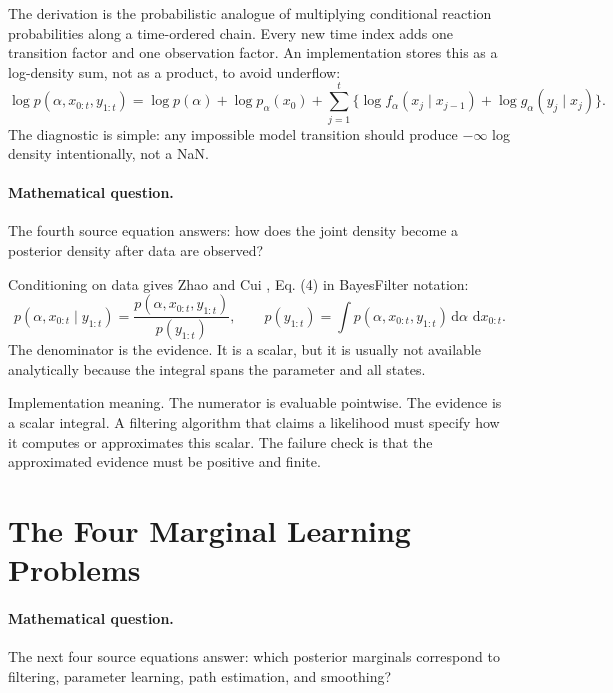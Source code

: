 \documentclass[11pt]{article}
\numberwithin{equation}{section}
\newcommand{\dd}{\,\mathrm d}
\begin{document}
The derivation is the probabilistic analogue of multiplying conditional
reaction probabilities along a time-ordered chain.  Every new time index adds
one transition factor and one observation factor.  An implementation stores
this as a log-density sum, not as a product, to avoid underflow:
\begin{equation}
    \log p(\alpha,x_{0:t},y_{1:t})
    =
    \log p(\alpha)+\log p_\alpha(x_0)
    +
    \sum_{j=1}^t
    \{\log f_\alpha(x_j\mid x_{j-1})+\log g_\alpha(y_j\mid x_j)\}.
    \label{eq:p24-bf-3a}
\end{equation}
The diagnostic is simple: any impossible model transition should produce
\(-\infty\) log density intentionally, not a NaN.

\paragraph{Mathematical question.}
The fourth source equation answers: how does the joint density become a
posterior density after data are observed?

Conditioning on data gives Zhao and Cui \cite{zhao2024ttsequential}, Eq. (4) in BayesFilter notation:
\begin{equation}
    p(\alpha,x_{0:t}\mid y_{1:t})
    =
    \frac{p(\alpha,x_{0:t},y_{1:t})}
    {p(y_{1:t})},
    \qquad
    p(y_{1:t})
    =
    \int p(\alpha,x_{0:t},y_{1:t})
    \dd\alpha\,\dd x_{0:t}.
    \label{eq:p24-bf-4}
\end{equation}
The denominator is the evidence.  It is a scalar, but it is usually not
available analytically because the integral spans the parameter and all states.

Implementation meaning. The numerator is evaluable pointwise.  The
evidence is a scalar integral.  A filtering algorithm that claims a likelihood
must specify how it computes or approximates this scalar.  The failure check is
that the approximated evidence must be positive and finite.

\section{The Four Marginal Learning Problems}

\paragraph{Mathematical question.}
The next four source equations answer: which posterior marginals correspond to
filtering, parameter learning, path estimation, and smoothing?
\end{document}
